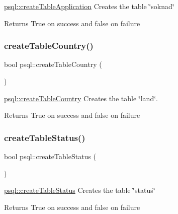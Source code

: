 \mbox{\hyperlink{classpsql_a36f6a197a2214b9c71cfcd620334835d}{psql\+::create\+Table\+Application}} Creates the table \char`\"{}soknad\char`\"{} 

\begin{DoxyReturn}{Returns}
True on success and false on failure 
\end{DoxyReturn}
\mbox{\label{classpsql_ab6e496d8471f3cd9c5c082a6ba75c25b}} 
\subsubsection{\texorpdfstring{create\+Table\+Country()}{createTableCountry()}}
{\footnotesize\ttfamily bool psql\+::create\+Table\+Country (\begin{DoxyParamCaption}{ }\end{DoxyParamCaption})}



\mbox{\hyperlink{classpsql_ab6e496d8471f3cd9c5c082a6ba75c25b}{psql\+::create\+Table\+Country}} Creates the table \char`\"{}land\char`\"{}. 

\begin{DoxyReturn}{Returns}
True on success and false on failure 
\end{DoxyReturn}
\mbox{\label{classpsql_a427ad0f483c8ab7a4d23912278bc69e8}} 
\subsubsection{\texorpdfstring{create\+Table\+Status()}{createTableStatus()}}
{\footnotesize\ttfamily bool psql\+::create\+Table\+Status (\begin{DoxyParamCaption}{ }\end{DoxyParamCaption})}



\mbox{\hyperlink{classpsql_a427ad0f483c8ab7a4d23912278bc69e8}{psql\+::create\+Table\+Status}} Creates the table \char`\"{}status\char`\"{} 

\begin{DoxyReturn}{Returns}
True on success and false on failure 
\end{DoxyReturn}
\mbox{\label{classpsql_a95d1f522766174bd2c6a7b94f725719c}} 
